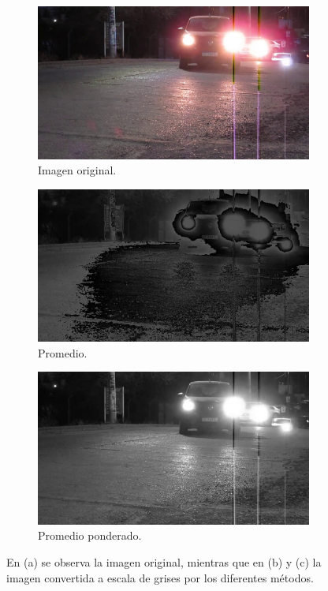 \begin{figure}[bth]
    \centering
    \begin{subfigure}[b]{0.3\textwidth}
        \centering
        \includegraphics[width=\textwidth]{imgs/escala-grises-original.jpg}
        \caption{Imagen original.}
    \end{subfigure}
    \hfill
    \begin{subfigure}[b]{.3\textwidth}
        \centering
        \includegraphics[width=\textwidth]{imgs/escala-grises-promedio.jpg}
        \caption{Promedio.}
    \end{subfigure}
    \hfill
    \begin{subfigure}[b]{.3\textwidth}
        \centering
        \includegraphics[width=\textwidth]{imgs/escala-grises-sensibilidad.jpg}
        \caption{Promedio ponderado.}
    \end{subfigure}
    \hfill
    \caption{En (a) se observa la imagen original, mientras que en (b) y (c) la imagen convertida a escala de grises por los diferentes métodos.}
    \label{fig:comparacion-grises}
\end{figure}

